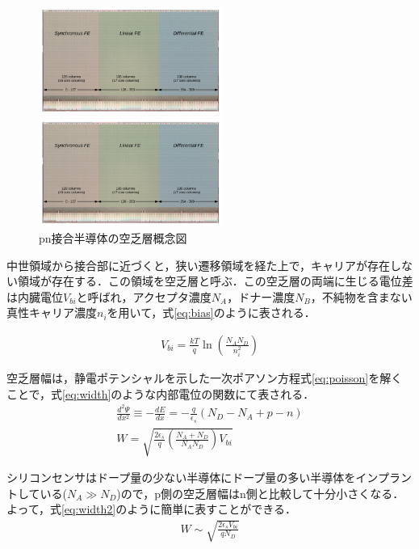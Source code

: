 \begin{figure}[h]
  \centering
  \begin{minipage}[b]{0.4\linewidth}
    \includegraphics[width=6cm]{./figure/RD53A_FE.png}
  \end{minipage}
  \begin{minipage}[b]{0.4\linewidth}
    \includegraphics[width=6cm]{./figure/RD53A_FE.png}
  \end{minipage}
  \caption{pn接合半導体の空乏層概念図}
  \label{fig:pn}
\end{figure}


中世領域から接合部に近づくと，狭い遷移領域を経た上で，キャリアが存在しない領域が存在する．この領域を空乏層と呼ぶ．この空乏層の両端に生じる電位差は内臓電位$V_{bi}$と呼ばれ，アクセプタ濃度$N_A$，ドナー濃度$N_B$，不純物を含まない真性キャリア濃度$n_i$を用いて，式\ref{eq:bias}のように表される．\par
\begin{eqnarray}
  \label{eq:bias}
  V_{bi} = \frac{kT}{q} \ln \left( \frac{N_A N_D}{n_i^2} \right) 
\end{eqnarray}

空乏層幅は，静電ポテンシャルを示した一次ポアソン方程式\ref{eq:poisson}を解くことで，式\ref{eq:width}のような内部電位の関数にて表される．
\begin{eqnarray}
  \label{eq:poisson}
  \frac{d^2\Psi}{dx^2} \equiv -\frac{dE}{dx} = - \frac{q}{\epsilon_s}(N_D - N_A + p - n) \\
  \label{eq:width}
  W = \sqrt{ \frac{2\epsilon_s}{q} \left( \frac{N_A+N_D}{N_A N_D} \right) V_{bi}}
\end{eqnarray}

シリコンセンサはドープ量の少ない半導体にドープ量の多い半導体をインプラントしている($N_A \gg N_D$)ので，p側の空乏層幅はn側と比較して十分小さくなる．よって，式\ref{eq:width2}のように簡単に表すことができる．
\begin{eqnarray}
  \label{eq:width2}
  W \sim \sqrt{ \frac{2\epsilon_s V_{bi}}{q N_D} }
\end{eqnarray}

